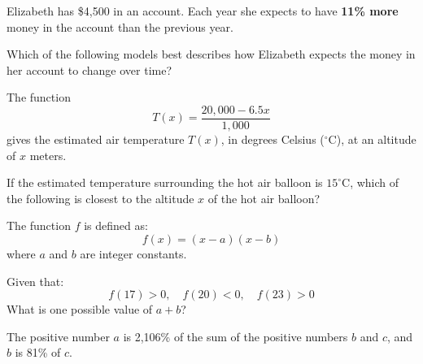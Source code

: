 \noindent\markforreview
\vspace{1em}

Elizabeth has \$4{,}500 in an account. Each year she expects to have \textbf{11\% more} money in the account than the previous year.

Which of the following models best describes how Elizabeth expects the money in her account to change over time?

\vspace{0.75em}


\vspace{2em}
\newpage

\noindent\markforreview
\vspace{1em}

The function
\[
T(x) = \frac{20{,}000 - 6.5x}{1{,}000}
\]
gives the estimated air temperature \(T(x)\), in degrees Celsius (\(^\circ\text{C}\)), at an altitude of \(x\) meters.

If the estimated temperature surrounding the hot air balloon is \(15^\circ\text{C}\), which of the following is closest to the altitude \(x\) of the hot air balloon?

\vspace{0.75em}


\vspace{2em}
\newpage

\noindent\markforreview
\vspace{1em}

The function \(f\) is defined as:
\[
f(x) = (x - a)(x - b)
\]
where \(a\) and \(b\) are integer constants.

Given that:
\[
f(17) > 0,\quad f(20) < 0,\quad f(23) > 0
\]
What is one possible value of \(a + b\)?

\vspace{0.75em}


\vspace{2em}
\newpage

\noindent\markforreview
\vspace{1em}

The positive number \(a\) is 2,106\% of the sum of the positive numbers \(b\) and \(c\), and \(b\) is 81\% of \(c\).

